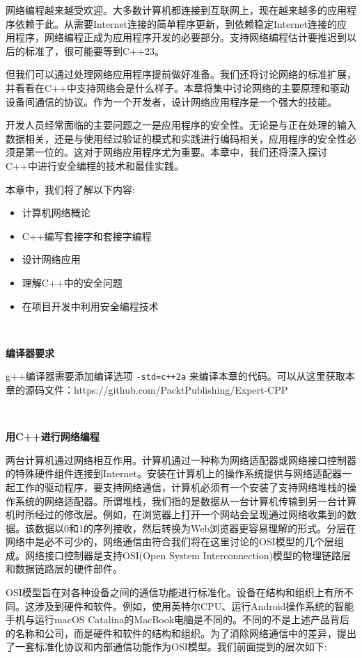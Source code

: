 网络编程越来越受欢迎。大多数计算机都连接到互联网上，现在越来越多的应用程序依赖于此。从需要Internet连接的简单程序更新，到依赖稳定Internet连接的应用程序，网络编程正成为应用程序开发的必要部分。支持网络编程估计要推迟到以后的标准了，很可能要等到C++23。 \par
但我们可以通过处理网络应用程序提前做好准备。我们还将讨论网络的标准扩展，并看看在C++中支持网络会是什么样子。本章将集中讨论网络的主要原理和驱动设备间通信的协议。作为一个开发者，设计网络应用程序是一个强大的技能。 \par
开发人员经常面临的主要问题之一是应用程序的安全性。无论是与正在处理的输入数据相关，还是与使用经过验证的模式和实践进行编码相关，应用程序的安全性必须是第一位的。这对于网络应用程序尤为重要。本章中，我们还将深入探讨C++中进行安全编程的技术和最佳实践。 \par

本章中，我们将了解以下内容: \par

\begin{itemize}
	\item 计算机网络概论
	\item C++编写套接字和套接字编程
	\item 设计网络应用
	\item 理解C++中的安全问题
	\item 在项目开发中利用安全编程技术
\end{itemize}

\noindent\textbf{}\ \par
\textbf{编译器要求} \ \par
g++编译器需要添加编译选项 \texttt{-std=c++2a} 来编译本章的代码。可以从这里获取本章的源码文件：https:/​/github.​com/PacktPublishing/Expert-CPP \par

\noindent\textbf{}\ \par
\textbf{用C++进行网络编程} \ \par
两台计算机通过网络相互作用。计算机通过一种称为网络适配器或网络接口控制器的特殊硬件组件连接到Internet。安装在计算机上的操作系统提供与网络适配器一起工作的驱动程序，要支持网络通信，计算机必须有一个安装了支持网络堆栈的操作系统的网络适配器。所谓堆栈，我们指的是数据从一台计算机传输到另一台计算机时所经过的修改层。例如，在浏览器上打开一个网站会呈现通过网络收集到的数据。该数据以0和1的序列接收，然后转换为Web浏览器更容易理解的形式。分层在网络中是必不可少的，网络通信由符合我们将在这里讨论的OSI模型的几个层组成。网络接口控制器是支持OSI(Open System Interconnection)模型的物理链路层和数据链路层的硬件部件。 \par
OSI模型旨在对各种设备之间的通信功能进行标准化。设备在结构和组织上有所不同。这涉及到硬件和软件。例如，使用英特尔CPU、运行Android操作系统的智能手机与运行macOS Catalina的MacBook电脑是不同的。不同的不是上述产品背后的名称和公司，而是硬件和软件的结构和组织。为了消除网络通信中的差异，提出了一套标准化协议和内部通信功能作为OSI模型。我们前面提到的层次如下: \par

